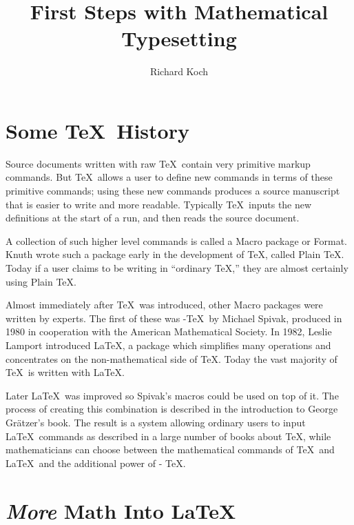 \documentclass[11pt, oneside]{amsart}
\title{First Steps with Mathematical Typesetting }
\author{Richard Koch}
\begin{document}
\maketitle
\begin{multicols}{2}

\section{Some \TeX\ History}
\thispagestyle{empty}

Source documents written with raw \TeX\ contain very primitive markup commands. But  \TeX\ allows a user to define new commands in terms of these primitive commands; using these new commands produces a source manuscript that is easier to write and more readable.
Typically \TeX\ inputs the new definitions at the start of a run, and then reads the source document.

A collection of such higher level commands is called a Macro package or Format. Knuth wrote such a package early in the development of \TeX, called Plain \TeX. Today if a user claims to be writing in ``ordinary \TeX,'' they are almost certainly using Plain \TeX.

Almost immediately after \TeX\ was introduced, other Macro packages were written by experts. The first of these was \AmS-\TeX\ by Michael Spivak, produced in 1980 in cooperation with the American Mathematical Society. In 1982, Leslie Lamport introduced \LaTeX, a package which simplifies many operations and concentrates on the non-mathematical side of \TeX. Today the vast majority of \TeX\ is written with \LaTeX.

Later \LaTeX\ was improved so Spivak's macros could be used on top of it. The process of creating this combination is described in the introduction to George Gr\"atzer's book. The result is a system allowing ordinary users to input \LaTeX\ commands as described in a large number of books about \TeX, while mathematicians can choose between the mathematical commands of \TeX\ and \LaTeX\ and the additional power of \AmS- \TeX.

\section{\emph{More} Math Into \LaTeX}


\end{multicols}
\end{document}

